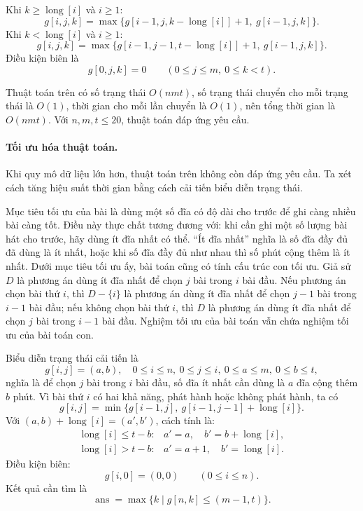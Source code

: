\documentclass[11pt]{article}
\begin{document}
Khi \(k\ge \operatorname{long}[i]\) và \(i\ge1\):
\[
  g[i,j,k]=\max\{g[i-1,j,k-\operatorname{long}[i]]+1,\ g[i-1,j,k]\}.
\]
Khi \(k<\operatorname{long}[i]\) và \(i\ge1\):
\[
  g[i,j,k]=
  \max\{g[i-1,j-1,t-\operatorname{long}[i]]+1,\ g[i-1,j,k]\}.
\]
Điều kiện biên là
\[
  g[0,j,k]=0 \qquad (0\le j\le m,\ 0\le k<t).
\]

Thuật toán trên có số trạng thái \(O(nmt)\), số trạng thái chuyển cho mỗi
trạng thái là \(O(1)\), thời gian cho mỗi lần chuyển là \(O(1)\), nên tổng
thời gian là \(O(nmt)\). Với \(n,m,t\le20\), thuật toán đáp ứng yêu cầu.

\paragraph{Tối ưu hóa thuật toán.}
Khi quy mô dữ liệu lớn hơn, thuật toán trên không còn đáp ứng yêu cầu. Ta xét
cách tăng hiệu suất thời gian bằng cách cải tiến biểu diễn trạng thái.

Mục tiêu tối ưu của bài là dùng một số đĩa có độ dài cho trước để ghi càng
nhiều bài càng tốt. Điều này thực chất tương đương với: khi cần ghi một số
lượng bài hát cho trước, hãy dùng ít đĩa nhất có thể. ``Ít đĩa nhất'' nghĩa
là số đĩa đầy đủ đã dùng là ít nhất, hoặc khi số đĩa đầy đủ như nhau thì số
phút cộng thêm là ít nhất. Dưới mục tiêu tối ưu ấy, bài toán cũng có tính
cấu trúc con tối ưu. Giả sử \(D\) là phương án dùng ít đĩa nhất để chọn \(j\)
bài trong \(i\) bài đầu. Nếu phương án chọn bài thứ \(i\), thì \(D-\{i\}\) là
phương án dùng ít đĩa nhất để chọn \(j-1\) bài trong \(i-1\) bài đầu; nếu
không chọn bài thứ \(i\), thì \(D\) là phương án dùng ít đĩa nhất để chọn
\(j\) bài trong \(i-1\) bài đầu. Nghiệm tối ưu của bài toán vẫn chứa nghiệm
tối ưu của bài toán con.

Biểu diễn trạng thái cải tiến là
\[
  g[i,j]=(a,b),\quad
  0\le i\le n,\ 0\le j\le i,\ 0\le a\le m,\ 0\le b\le t,
\]
nghĩa là để chọn \(j\) bài trong \(i\) bài đầu, số đĩa ít nhất cần dùng là
\(a\) đĩa cộng thêm \(b\) phút. Vì bài thứ \(i\) có hai khả năng, phát hành
hoặc không phát hành, ta có
\[
  g[i,j]=\min\{g[i-1,j],\ g[i-1,j-1]+\operatorname{long}[i]\}.
\]
Với \((a,b)+\operatorname{long}[i]=(a',b')\), cách tính là:
\[
\begin{array}{ll}
\operatorname{long}[i]\le t-b: & a'=a,\quad b'=b+\operatorname{long}[i],\\
\operatorname{long}[i]>t-b: & a'=a+1,\quad b'=\operatorname{long}[i].
\end{array}
\]
Điều kiện biên:
\[
  g[i,0]=(0,0) \qquad (0\le i\le n).
\]
Kết quả cần tìm là
\[
  \operatorname{ans}=\max\{k\mid g[n,k]\le (m-1,t)\}.
\]
\end{document}
